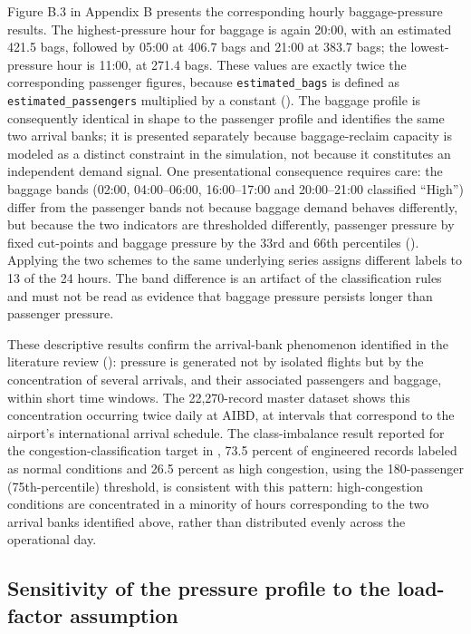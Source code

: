 Figure B.3 in Appendix B presents the corresponding hourly baggage-pressure results. The highest-pressure hour for baggage is again 20:00, with an estimated 421.5 bags, followed by 05:00 at 406.7 bags and 21:00 at 383.7 bags; the lowest-pressure hour is 11:00, at 271.4 bags. These values are exactly twice the corresponding passenger figures, because \nolinkurl{estimated_bags} is defined as \nolinkurl{estimated_passengers} multiplied by a constant (). The baggage profile is consequently identical in shape to the passenger profile and identifies the same two arrival banks; it is presented separately because baggage-reclaim capacity is modeled as a distinct constraint in the simulation, not because it constitutes an independent demand signal. One presentational consequence requires care: the baggage bands (02:00, 04:00--06:00, 16:00--17:00 and 20:00--21:00 classified ``High'') differ from the passenger bands not because baggage demand behaves differently, but because the two indicators are thresholded differently, passenger pressure by fixed cut-points and baggage pressure by the 33rd and 66th percentiles (). Applying the two schemes to the same underlying series assigns different labels to 13 of the 24 hours. The band difference is an artifact of the classification rules and must not be read as evidence that baggage pressure persists longer than passenger pressure.

These descriptive results confirm the arrival-bank phenomenon identified in the literature review (): pressure is generated not by isolated flights but by the concentration of several arrivals, and their associated passengers and baggage, within short time windows. The 22,270-record master dataset shows this concentration occurring twice daily at AIBD, at intervals that correspond to the airport's international arrival schedule. The class-imbalance result reported for the congestion-classification target in , 73.5 percent of engineered records labeled as normal conditions and 26.5 percent as high congestion, using the 180-passenger (75th-percentile) threshold, is consistent with this pattern: high-congestion conditions are concentrated in a minority of hours corresponding to the two arrival banks identified above, rather than distributed evenly across the operational day.

\subsection{Sensitivity of the pressure profile to the load-factor assumption}
\label{subsec:load-factor-sensitivity}


